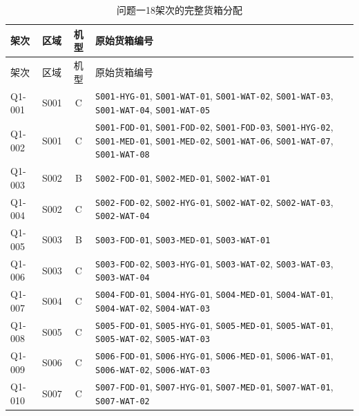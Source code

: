 \begin{longtable}{@{}llc>{\raggedright\arraybackslash}p{9.3cm}@{}}
\caption{问题一18架次的完整货箱分配}\label{tab:app_q1_boxes}\\
\toprule
架次 & 区域 & 机型 & 原始货箱编号\\
\midrule
\endfirsthead
\toprule
架次 & 区域 & 机型 & 原始货箱编号\\
\midrule
\endhead
Q1-001 & S001 & C & \texttt{S001-HYG-01}\allowbreak, \texttt{S001-WAT-01}\allowbreak, \texttt{S001-WAT-02}\allowbreak, \texttt{S001-WAT-03}\allowbreak, \texttt{S001-WAT-04}\allowbreak, \texttt{S001-WAT-05}\allowbreak\\
Q1-002 & S001 & C & \texttt{S001-FOD-01}\allowbreak, \texttt{S001-FOD-02}\allowbreak, \texttt{S001-FOD-03}\allowbreak, \texttt{S001-HYG-02}\allowbreak, \texttt{S001-MED-01}\allowbreak, \texttt{S001-MED-02}\allowbreak, \texttt{S001-WAT-06}\allowbreak, \texttt{S001-WAT-07}\allowbreak, \texttt{S001-WAT-08}\allowbreak\\
Q1-003 & S002 & B & \texttt{S002-FOD-01}\allowbreak, \texttt{S002-MED-01}\allowbreak, \texttt{S002-WAT-01}\allowbreak\\
Q1-004 & S002 & C & \texttt{S002-FOD-02}\allowbreak, \texttt{S002-HYG-01}\allowbreak, \texttt{S002-WAT-02}\allowbreak, \texttt{S002-WAT-03}\allowbreak, \texttt{S002-WAT-04}\allowbreak\\
Q1-005 & S003 & B & \texttt{S003-FOD-01}\allowbreak, \texttt{S003-MED-01}\allowbreak, \texttt{S003-WAT-01}\allowbreak\\
Q1-006 & S003 & C & \texttt{S003-FOD-02}\allowbreak, \texttt{S003-HYG-01}\allowbreak, \texttt{S003-WAT-02}\allowbreak, \texttt{S003-WAT-03}\allowbreak, \texttt{S003-WAT-04}\allowbreak\\
Q1-007 & S004 & C & \texttt{S004-FOD-01}\allowbreak, \texttt{S004-HYG-01}\allowbreak, \texttt{S004-MED-01}\allowbreak, \texttt{S004-WAT-01}\allowbreak, \texttt{S004-WAT-02}\allowbreak, \texttt{S004-WAT-03}\allowbreak\\
Q1-008 & S005 & C & \texttt{S005-FOD-01}\allowbreak, \texttt{S005-HYG-01}\allowbreak, \texttt{S005-MED-01}\allowbreak, \texttt{S005-WAT-01}\allowbreak, \texttt{S005-WAT-02}\allowbreak, \texttt{S005-WAT-03}\allowbreak\\
Q1-009 & S006 & C & \texttt{S006-FOD-01}\allowbreak, \texttt{S006-HYG-01}\allowbreak, \texttt{S006-MED-01}\allowbreak, \texttt{S006-WAT-01}\allowbreak, \texttt{S006-WAT-02}\allowbreak, \texttt{S006-WAT-03}\allowbreak\\
Q1-010 & S007 & C & \texttt{S007-FOD-01}\allowbreak, \texttt{S007-HYG-01}\allowbreak, \texttt{S007-MED-01}\allowbreak, \texttt{S007-WAT-01}\allowbreak, \texttt{S007-WAT-02}\allowbreak\\

\end{longtable}
